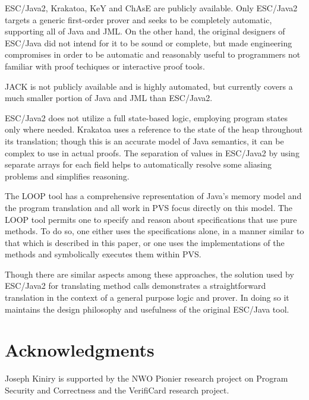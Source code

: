 \documentclass{sig-alternate}
\begin{document}
ESC/Java2, Krakatoa, KeY and ChAsE are publicly available.  Only
ESC/Java2 targets a generic first-order prover and seeks to be
completely automatic, supporting all of Java and JML.  On the other
hand, the original designers of ESC/Java did not intend for it to be
sound or complete, but made engineering compromises in order to be
automatic and reasonably useful to programmers not familiar with proof
techiques or interactive proof tools.

JACK is not publicly available and is highly automated, but currently
covers a much smaller portion of Java and JML than ESC/Java2.

ESC/Java2 does not utilize a full state-based logic, employing program
states only where needed.  Krakatoa uses a reference to the state of
the heap throughout its translation; though this is an accurate model
of Java semantics, it can be complex to use in actual proofs.  The
separation of values in ESC/Java2 by using separate arrays for each
field helps to automatically resolve some aliasing problems and
simplifies reasoning.

The LOOP tool has a comprehensive representation of Java's memory
model and the program translation and all work in PVS focus directly
on this model.  The LOOP tool permits one to specify and reason about
specifications that use pure methods. To do so, one either uses the
specifications alone, in a manner similar to that which is described
in this paper, or one uses the implementations of the methods and 
symbolically executes them within PVS.

Though there are similar aspects among these approaches, the solution
used by ESC/Java2 for translating method calls demonstrates a
straightforward translation in the context of a general purpose logic
and prover.  In doing so it maintains the design philosophy and
usefulness of the original ESC/Java tool.

\section{Acknowledgments}

Joseph Kiniry is supported by the NWO Pionier research
project on Program Security and Correctness and the VerifiCard
research project. 


%

%

  


%
%



\end{document}
